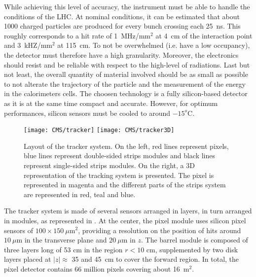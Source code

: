         While achieving this level of accuracy, the instrument must be able to handle the conditions of
        the LHC. At nominal conditions, it can be estimated that about 1000 charged particles
        are produced for every bunch crossing each 25~ns. This roughly corresponds to a
        hit rate of 1~MHz/mm$^2$ at 4~cm of the interaction point and 3~kHZ/mm$^2$ at 115~cm.
        To not be overwhelmed (i.e. have a low occupancy), the detector must therefore
        have a high granularity. Moreover, the electronics should resist and be reliable
        with respect to the high-level of radiations. Last but not least, the overall
        quantity of material involved should be as small as possible to not alterate the
        trajectory of the particle and the measurement of the energy in the calorimeters
        cells. The choosen technology is a fully silicon-based detector as it is at the
        same time compact and accurate. However, for optimum performances, silicon sensors
        must be cooled to around $-15^o$C.

        \begin{figure}[h!]
            \centering
            \texttt{[image: CMS/tracker]}
            \texttt{[image: CMS/tracker3D]}
            \caption{Layout of the tracker system.
            On the left, red lines represent pixels, blue lines represent double-sided
            strips modules and black lines represent single-sided strips modules. On the
            right, a 3D representation of the tracking system is presented. The pixel
            is represented in magenta and the different parts of the strips system are
            represented in red, teal and blue.}
            \label{fig:CMS/tracker}
        \end{figure}

        The tracker system is made of several sensors arranged in layers, in turn arranged
        in modules, as represented in . At the center, the pixel module
        uses silicon pixel sensors of $100 \times 150~\mu\text{m}^2$, providing a resolution
        on the position of hits around $10~\mu\text{m}$ in the transverse plane and
        $20~\mu\text{m}$ in $z$. The barrel module is composed of three layers long of 53 cm in the
        region $r < 10$ cm, supplemented by two disk layers placed at $\left|z\right| \approx$
        35 and 45~cm to cover the forward region. In total, the pixel detector contains 66
        million pixels covering about 16~m$^2$.

